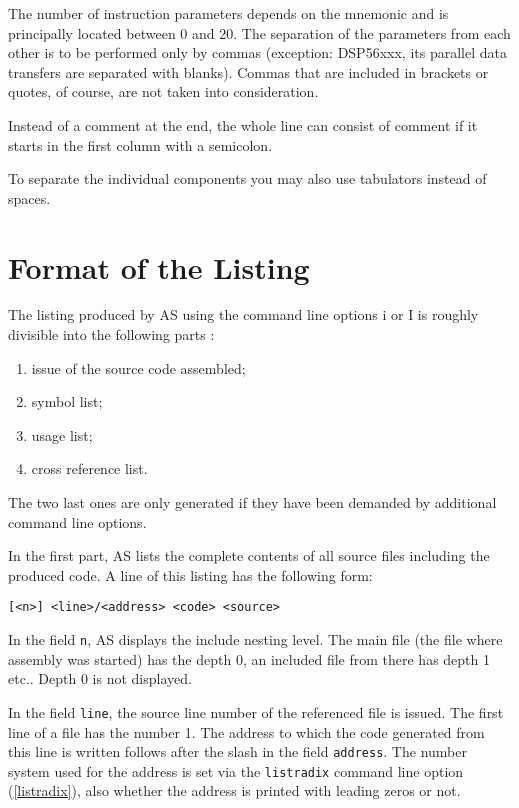 \documentclass[12pt,twoside]{report}
\newcommand{\tty}[1]{{\tt #1}}
\newcommand{\asname}{{AS}}
\begin{document}
The number of instruction parameters depends on the mnemonic and is
principally located between 0 and 20.  The separation of the parameters
from each other is to be performed only by commas (exception: DSP56xxx,
its parallel data transfers are separated with blanks).  Commas that
are included in brackets or quotes, of course, are not taken into
consideration.

Instead of a comment at the end, the whole line can consist of
comment if it starts in the first column with a semicolon.

To separate the individual components you may also use tabulators
instead of spaces.


\section{Format of the Listing}

The listing produced by \asname{} using the command line options i or I is
roughly divisible into the following parts :
\begin{enumerate}
\item{issue of the source code assembled;}
\item{symbol list;}
\item{usage list;}
\item{cross reference list.}
\end{enumerate}
The two last ones are only generated if they have been demanded by
additional command line options.

In the first part, \asname{} lists the complete contents of all source files
including the produced code.  A line of this listing has the following
form:
\begin{verbatim}
[<n>] <line>/<address> <code> <source>
\end{verbatim}
In the field \tty{n}, \asname{} displays the include nesting level.  The main file
(the file where assembly was started) has the depth 0, an included
file from there has depth 1 etc..  Depth 0 is not displayed.

In the field \tty{line}, the source line number of the referenced file is
issued. The first line of a file has the number 1.  The address to
which the code generated from this line is written follows after the
slash in the field \tty{address}.  The number system used for the address
is set via the {\tt listradix} command line option (\ref{listradix}), also
whether the address is printed with leading zeros or not.
\end{document}
